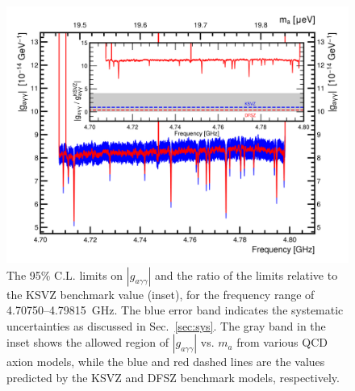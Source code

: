 \documentclass[%
reprint, %
superscriptaddress,
 amsmath,amssymb,
 aps
]{revtex4-2}
\begin{document}
\begin{figure} [htbp]
  \centering
  \includegraphics[width=12.9cm]{Figure10.png}
  \caption{The 95\% C.L. limits on $\left|g_{a\gamma\gamma}\right|$ and the 
 ratio of the limits relative to the KSVZ benchmark value  
  (inset), for the frequency range of 4.70750--4.79815~GHz. The blue error 
  band indicates the systematic uncertainties as discussed in 
  Sec.~\ref{sec:sys}. The gray band in the inset shows the allowed region of 
 $\left|g_{a\gamma\gamma}\right|$ vs. $m_a$ 
 from various QCD axion models, while the blue and red dashed lines are the 
values predicted by the KSVZ and DFSZ benchmark models, respectively.}
  \label{fig:glimit}
\end{figure}
\end{document}
